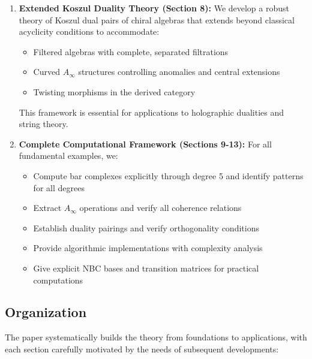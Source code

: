 \begin{enumerate}
\item \textbf{Extended Koszul Duality Theory (Section 8):} We develop a robust theory of Koszul dual pairs of chiral algebras that extends beyond classical acyclicity conditions to accommodate:
\begin{itemize}
\item Filtered algebras with complete, separated filtrations
\item Curved $A_\infty$ structures controlling anomalies and central extensions
\item Twisting morphisms in the derived category
\end{itemize}
This framework is essential for applications to holographic dualities and string theory.
 
\item \textbf{Complete Computational Framework (Sections 9-13):} For all fundamental examples, we:
\begin{itemize}
\item Compute bar complexes explicitly through degree 5 and identify patterns for all degrees
\item Extract $A_\infty$ operations and verify all coherence relations
\item Establish duality pairings and verify orthogonality conditions
\item Provide algorithmic implementations with complexity analysis
\item Give explicit NBC bases and transition matrices for practical computations
\end{itemize}
\end{enumerate}
 
\subsection{Organization}
 
The paper systematically builds the theory from foundations to applications, with each section carefully motivated by the needs of subsequent developments:
 
